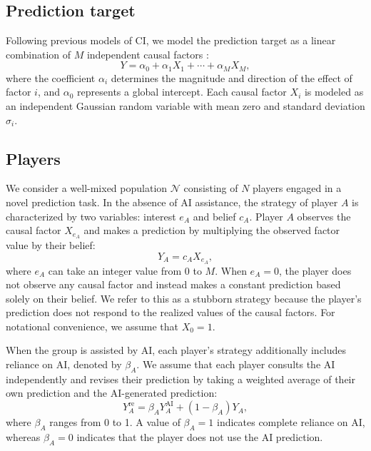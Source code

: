 \documentclass[12pt]{article}
\begin{document}
\subsection*{Prediction target}

Following previous models of CI, we model the prediction target as a linear combination of $M$ independent causal factors \citep{hong2012incentives,mann2017optimal,wang2025individual}:
\begin{equation}
Y = \alpha_0 + \alpha_1 X_1 + \cdots + \alpha_M X_M,
\end{equation}
where the coefficient $\alpha_i$ determines the magnitude and direction of the effect of factor $i$, and $\alpha_0$ represents a global intercept. 
Each causal factor $X_i$ is modeled as an independent Gaussian random variable with mean zero and standard deviation $\sigma_i$.

\subsection*{Players}

We consider a well-mixed population $\mathcal{N}$ consisting of $N$ players engaged in a novel prediction task. 
In the absence of AI assistance, the strategy of player $A$ is characterized by two variables: interest $e_A$ and belief $c_A$. 
Player $A$ observes the causal factor $X_{e_A}$ and makes a prediction by multiplying the observed factor value by their belief:
\begin{equation}
Y_A = c_A X_{e_A},
\end{equation}
where $e_A$ can take an integer value from 0 to $M$. 
When $e_A=0$, the player does not observe any causal factor and instead makes a constant prediction based solely on their belief. 
We refer to this as a stubborn strategy because the player's prediction does not respond to the realized values of the causal factors. 
For notational convenience, we assume that $X_0=1$.

When the group is assisted by AI, each player's strategy additionally includes reliance on AI, denoted by $\beta_A$. We assume that each player consults the AI independently and revises their prediction by taking a weighted average of their own prediction and the AI-generated prediction:
\begin{equation}
Y_A^{\mathrm{re}} = \beta_A Y_A^{\mathrm{AI}} + (1-\beta_A)Y_A,
\end{equation}
where $\beta_A$ ranges from 0 to 1. 
A value of $\beta_A=1$ indicates complete reliance on AI, whereas $\beta_A=0$ indicates that the player does not use the AI prediction.
\end{document}
